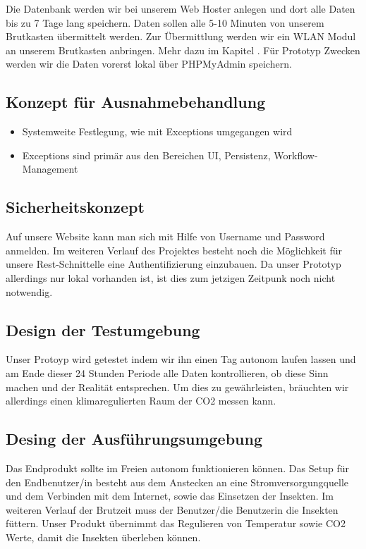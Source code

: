 	Die Datenbank werden wir bei unserem Web Hoster anlegen und dort alle Daten bis zu 7 Tage lang speichern. Daten sollen alle 5-10 Minuten von unserem Brutkasten übermittelt werden. Zur Übermittlung werden wir ein WLAN Modul an unserem Brutkasten anbringen. Mehr dazu im Kapitel . Für Prototyp Zwecken werden wir die Daten vorerst lokal über PHPMyAdmin speichern.
	\newpage
	\def \currentAuthor{}
\subsection{Konzept für Ausnahmebehandlung}
\begin{itemize}
	\item Systemweite Festlegung, wie mit Exceptions umgegangen wird
	\item Exceptions sind primär aus den Bereichen UI, Persistenz, Workflow-Management
\end{itemize}
	\newpage
	\def \currentAuthor{Florian Tipotsch}
\subsection{Sicherheitskonzept}                             Auf unsere Website kann man sich mit Hilfe von Username und Password anmelden. Im weiteren Verlauf des Projektes besteht noch die Möglichkeit für unsere Rest-Schnittelle eine Authentifizierung einzubauen. Da unser Prototyp allerdings nur lokal vorhanden ist, ist dies zum jetzigen Zeitpunk noch nicht notwendig.

\subsection{Design der Testumgebung}    
Unser Protoyp wird getestet indem wir ihn einen Tag autonom laufen lassen und am Ende dieser 24 Stunden Periode alle Daten kontrollieren, ob diese Sinn machen und der Realität entsprechen. Um dies zu gewährleisten, bräuchten wir allerdings einen klimaregulierten Raum der CO2 messen kann.

\subsection{Desing der Ausführungsumgebung}                                                                    Das Endprodukt sollte im Freien autonom funktionieren können. Das Setup für den Endbenutzer/in besteht aus dem Anstecken an eine Stromversorgungquelle und dem Verbinden mit dem Internet, sowie das Einsetzen der Insekten. Im weiteren Verlauf der Brutzeit muss der Benutzer/die Benutzerin die Insekten füttern. Unser Produkt übernimmt das Regulieren von Temperatur sowie CO2 Werte, damit die Insekten überleben können.

